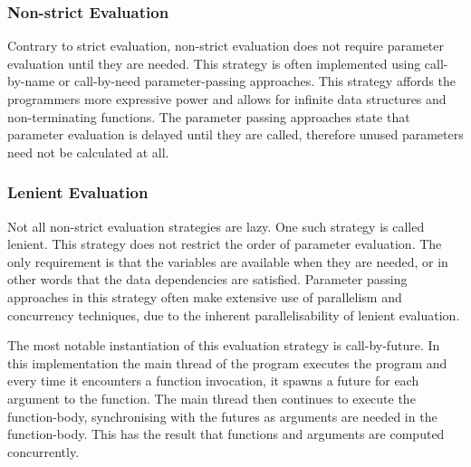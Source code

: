 \subsubsection{Non-strict Evaluation}
Contrary to strict evaluation, non-strict evaluation does not require parameter evaluation until they are needed\cite{hudak1989conception}. This strategy is often implemented using call-by-name or call-by-need parameter-passing approaches. This strategy affords the programmers more expressive power\cite{bird1997more} and allows for infinite data structures and non-terminating functions\cite[p.~103]{huttel2010transitions}. The parameter passing approaches state that parameter evaluation is delayed until they are called, therefore unused parameters need not be calculated at all.

\subsubsection{Lenient Evaluation}
Not all non-strict evaluation strategies are lazy. One such strategy is called lenient\cite{DBLP:journals/cl/Tremblay-lenient}. This strategy does not restrict the order of parameter evaluation. The only requirement is that the variables are available when they are needed, or in other words that the data dependencies are satisfied. Parameter passing approaches in this strategy often make extensive use of parallelism and concurrency techniques, due to the inherent parallelisability of lenient evaluation\cite{DBLP:journals/cl/Tremblay-parallel}.

The most notable instantiation of this evaluation strategy is call-by-future\cite{baker1977incremental}. In this implementation the main thread of the program executes the program and every time it encounters a function invocation, it spawns a future for each argument to the function. The main thread then continues to execute the function-body, synchronising with the futures as arguments are needed in the function-body. This has the result that functions and arguments are computed concurrently.


